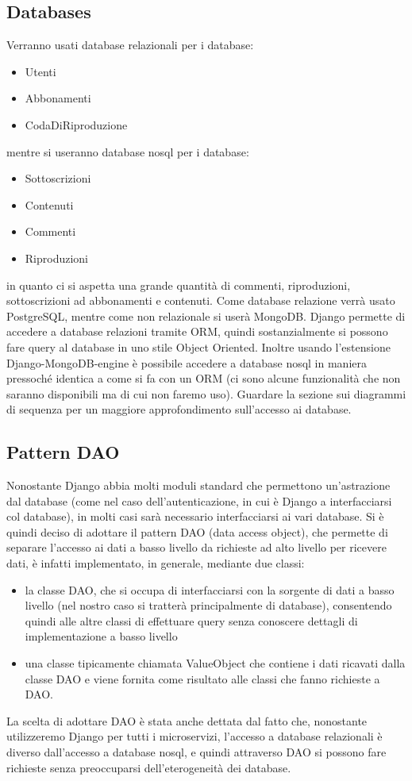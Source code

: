 \subsection{Databases}
Verranno usati database relazionali per i database:
\begin{itemize}
\item Utenti
\item Abbonamenti
\item CodaDiRiproduzione
\end{itemize}
mentre si useranno database nosql per i database:
\begin{itemize}
\item Sottoscrizioni
\item Contenuti
\item Commenti
\item Riproduzioni
\end{itemize}
in quanto ci si aspetta una grande quantità di commenti, riproduzioni, sottoscrizioni ad abbonamenti e contenuti. Come database relazione verrà usato PostgreSQL, mentre come non relazionale si userà MongoDB. Django permette di accedere a database relazioni tramite ORM, quindi sostanzialmente si possono fare query al database in uno stile Object Oriented. Inoltre usando l'estensione Django-MongoDB-engine è possibile accedere a database nosql in maniera pressoché identica a come si fa con un ORM (ci sono alcune funzionalità che non saranno disponibili ma di cui non faremo uso). Guardare la sezione sui diagrammi di sequenza per un maggiore approfondimento sull'accesso ai database.
\subsection{Pattern DAO}
Nonostante Django abbia molti moduli standard che permettono un'astrazione dal database (come nel caso dell'autenticazione, in cui è Django a interfacciarsi col database), in molti casi sarà necessario interfacciarsi ai vari database. Si è quindi deciso di adottare il pattern DAO (data access object), che permette di separare l'accesso ai dati a basso livello da richieste ad alto livello per ricevere dati, è infatti implementato, in generale, mediante due classi:
\begin{itemize}
\item la classe DAO, che si occupa di interfacciarsi con la sorgente di dati a basso livello (nel nostro caso si tratterà principalmente di database), consentendo quindi alle altre classi di effettuare query senza conoscere dettagli di implementazione a basso livello
\item una classe tipicamente chiamata ValueObject che contiene i dati ricavati dalla classe DAO e viene fornita come risultato alle classi che fanno richieste a DAO.
\end{itemize}
La scelta di adottare DAO è stata anche dettata dal fatto che, nonostante utilizzeremo Django per tutti i microservizi, l'accesso a database relazionali è diverso dall'accesso a database nosql, e quindi attraverso DAO si possono fare richieste senza preoccuparsi dell'eterogeneità dei database.
